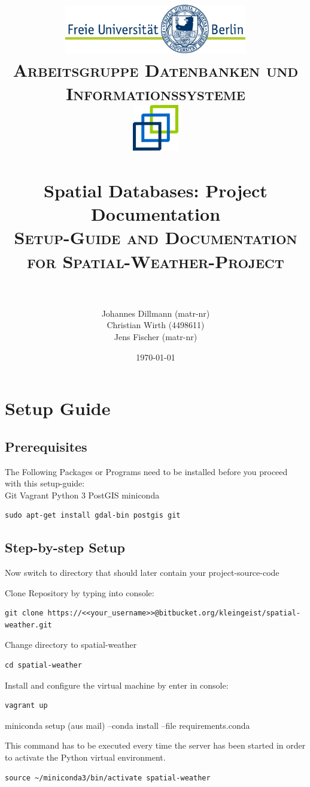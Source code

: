 \documentclass[paper=a4, fontsize=11pt]{scrartcl} %
\title{	
\normalfont \normalsize 
\textsc{\includegraphics[width=0.6\textwidth]{pictures/logo} \\ [5pt] Arbeitsgruppe Datenbanken und Informationssysteme \\ [20pt] \includegraphics[width=0.15\textwidth]{pictures/DBIS_Logo_rgb_web.png}} \\ [10pt] %
\horrule{0.5pt} \\[0.4cm] %
\huge Spatial Databases: Project Documentation \\ %
\normalsize \textsc{Setup-Guide and Documentation for Spatial-Weather-Project} \\ [0.4cm]
\horrule{2pt} \\[0.5cm] %
}
\author{Johannes Dillmann (matr-nr) \\ Christian Wirth (4498611) \\ Jens Fischer (matr-nr)}
\date{\normalsize\today} %
\numberwithin{equation}{section} %
\numberwithin{figure}{section} %
\numberwithin{table}{section} %
\begin{document}
\begin{titlepage}
\maketitle
\thispagestyle{empty}
\end{titlepage}

\newpage
\tableofcontents
\thispagestyle{empty}

\newpage
{}
\pagestyle{fancy}
\setcounter{page}{1}

\section{Setup Guide}
\subsection{Prerequisites}

The Following Packages or Programs need to be installed before you proceed with this setup-guide:\\
Git
Vagrant
Python 3
PostGIS
miniconda

\begin{lstlisting}
sudo apt-get install gdal-bin postgis git 
\end{lstlisting}

\subsection{Step-by-step Setup}
Now switch to directory that should later contain your project-source-code

Clone Repository by typing into console:
\begin{lstlisting}
git clone https://<<your_username>>@bitbucket.org/kleingeist/spatial-weather.git
\end{lstlisting}

Change directory to spatial-weather
\begin{lstlisting}
cd spatial-weather
\end{lstlisting}

Install and configure the virtual machine by enter in console:
\begin{lstlisting}
vagrant up
\end{lstlisting}
miniconda setup (aus mail)
--conda install --file requirements.conda

This command has to be executed every time the server has been started in order to activate the Python virtual environment.
\begin{lstlisting}
source ~/miniconda3/bin/activate spatial-weather
\end{lstlisting}
\end{document}
